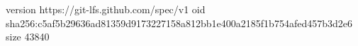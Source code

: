 version https://git-lfs.github.com/spec/v1
oid sha256:c5af5b29636ad81359d9173227158a812bb1e400a2185f1b754afed457b3d2e6
size 43840
